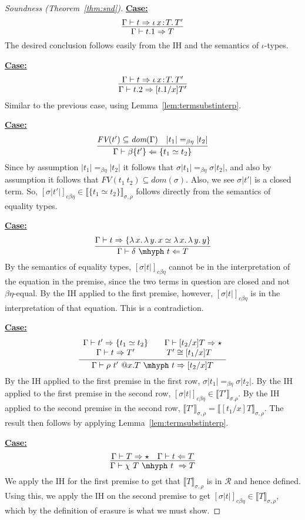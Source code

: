 \documentclass{article}
\newcommand{\abs}[4]{{#1}\, #2\! : \! #3.\, #4}
\newcommand{\absu}[3]{{#1}\, #2.\, #3}
\newcommand{\interp}[1]{\llbracket #1 \rrbracket}
\newcommand{\tpcheck}[0]{\Leftarrow}
\newcommand{\tpsynth}[0]{\Rightarrow}
\newcommand{\cbe}[0]{c\beta\eta}
\newcommand{\startcase}[1]{\vspace{#1} \noindent\textbf{\underline{Case:}}}
\begin{document}
\begin{proof}[Soundness (Theorem~\ref{thm:snd})]
\startcase{.2cm}
\[
   \infer{\Gamma\vdash t.1 \tpsynth T}{\Gamma\vdash t \tpsynth \abs{\iota}{x}{T}{T'}} 
\]
The desired conclusion follows easily from the IH and the semantics of $\iota$-types.

\startcase{.2cm}
\[
    \infer{\Gamma\vdash t.2 \tpsynth [t.1/x]T'}{\Gamma\vdash t \tpsynth \abs{\iota}{x}{T}{T'}} 
\]
Similar to the previous case, using Lemma~\ref{lem:termsubstinterp}.

\startcase{.2cm}
\[
  \infer{\Gamma\vdash \beta\{t'\} \tpcheck \{ t_1 \simeq t_2 \}}
  {\textit{FV}(t')\subseteq \textit{dom}(\Gamma) \quad |t_1| =_{\beta\eta} |t_2|}
\]
Since by assumption \(|t_1| =_{\beta\eta} |t_2|\) it follows that \(\sigma|t_1|
=_{\beta\eta} \sigma|t_2|\), and also by assumption it follows that
\(\textit{FV}(t_1\ t_2) \subseteq \textit{dom}(\sigma)\).
Also, we see \(\sigma|t'|\) is a closed term.
So, $[\sigma|t'|]_{\cbe}\in\interp{\{ t_1 \simeq t_2 \}}_{\sigma,\rho}$ follows
directly from the semantics of equality types.

\startcase{.2cm}
\[
    \infer{\Gamma\vdash \delta\ \mhyph\ t \tpcheck T}{\Gamma\vdash t\tpsynth \{ \absu{\lambda}{x}{\absu{\lambda}{y}{x}} \simeq \absu{\lambda}{x}{\absu{\lambda}{y}{y}}\}}  
\]
By the semantics of equality types, $[\sigma|t|]_{\cbe}$ cannot be in the interpretation of the equation in the premise,
since the two terms in question are closed and not $\beta\eta$-equal.  By the IH applied to the first premise, however,
$[\sigma|t|]_{\cbe}$ is in the interpretation of that equation.  This is a contradiction.

\startcase{.2cm}
\[
  \infer{\Gamma \vdash \rho\ t'\ @x.T\ \mhyph\ t \tpsynth [t_2/x]T}
  {
    \begin{array}{cc}
      \Gamma \vdash t' \tpsynth \{t_1 \simeq t_2\}
      & \quad \Gamma \vdash [t_2/x]T \tpsynth \star
      \\ \Gamma \vdash t \tpsynth T'
      & T' \cong [t_1/x]T
    \end{array}
  }
\]
By the IH applied to the first premise in the first row, $\sigma|t_1| =_{\beta\eta}
\sigma|t_2|$.
By the IH applied to the first premise in the second row,
\([\sigma|t|]_{c\beta\eta} \in \interp{T'}_{\sigma.\rho}\).
By the IH applied to the second premise in the second row,
\(\interp{T'}_{\sigma,\rho} = \interp{[t_1/x]T}_{\sigma,\rho}\).
The result then follows by applying Lemma~\ref{lem:termsubstinterp}.

\startcase{.2cm}
\[
  \infer{\Gamma \vdash \chi\ T\ \mhyph\ t\ \tpsynth T}
  {\Gamma \vdash T \tpsynth \star & \Gamma \vdash t \tpcheck T}
\]
We apply the IH for the first premise to get that
$\interp{T}_{\sigma,\rho}$ is in $\mathcal{R}$ and hence defined.
Using this, we apply the IH on the second premise to get \([\sigma|t|]_{\cbe}
\in \interp{T}_{\sigma,\rho}\), which by the definition of erasure is what we
must show.


\end{proof}
\end{document}
